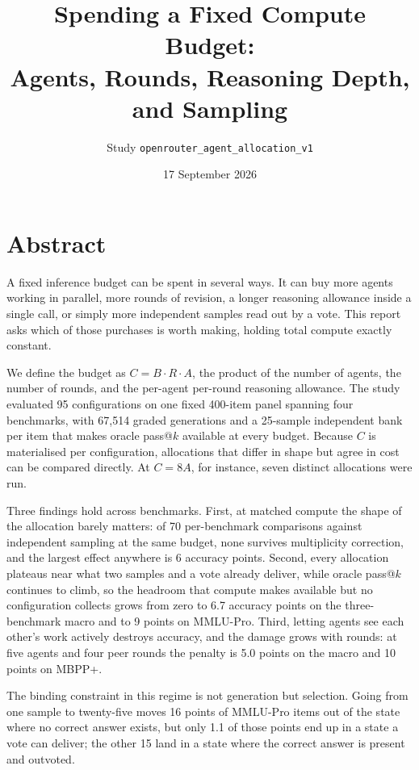 \documentclass[11pt]{article}
\title{\vspace{-2em}Spending a Fixed Compute Budget:\\
Agents, Rounds, Reasoning Depth, and Sampling}
\author{Study \texttt{openrouter\_agent\_allocation\_v1}}
\date{17 September 2026}
\begin{document}
\maketitle
\vspace{-1.5em}

\section*{Abstract}

A fixed inference budget can be spent in several ways. It can buy more agents working in
parallel, more rounds of revision, a longer reasoning allowance inside a single call, or simply
more independent samples read out by a vote. This report asks which of those purchases is worth
making, holding total compute exactly constant.

We define the budget as $C = B \cdot R \cdot A$, the product of the number of agents, the number
of rounds, and the per-agent per-round reasoning allowance. The study evaluated 95 configurations
on one fixed 400-item panel spanning four benchmarks, with 67{,}514 graded generations and a
25-sample independent bank per item that makes oracle pass@$k$ available at every budget. Because
$C$ is materialised per configuration, allocations that differ in shape but agree in cost can be
compared directly. At $C = 8A$, for instance, seven distinct allocations were run.

Three findings hold across benchmarks. First, at matched compute the shape of the allocation
barely matters: of 70 per-benchmark comparisons against independent sampling at the same budget,
none survives multiplicity correction, and the largest effect anywhere is 6 accuracy points.
Second, every allocation plateaus near what two samples and a vote already deliver, while oracle
pass@$k$ continues to climb, so the headroom that compute makes available but no configuration
collects grows from zero to 6.7 accuracy points on the three-benchmark macro and to 9 points on
MMLU-Pro. Third, letting agents see each other's work actively destroys accuracy, and the damage
grows with rounds: at five agents and four peer rounds the penalty is 5.0 points on the macro and
10 points on MBPP+.

The binding constraint in this regime is not generation but selection. Going from one sample to
twenty-five moves 16 points of MMLU-Pro items out of the state where no correct answer exists, but
only 1.1 of those points end up in a state a vote can deliver; the other 15 land in a state where
the correct answer is present and outvoted.
\end{document}
